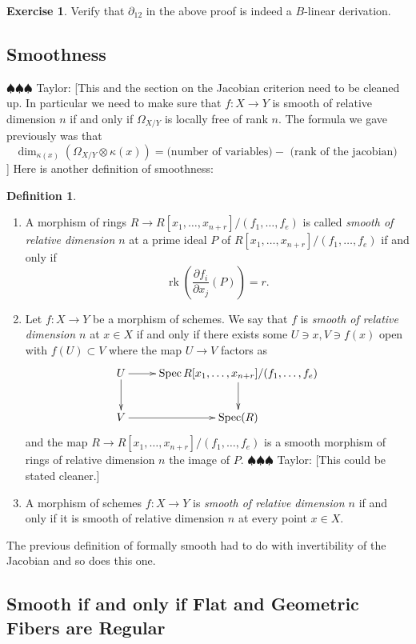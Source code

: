 \documentclass[12pt]{article}
\numberwithin{equation}{section}
\theoremstyle{definition}
\newtheorem{definition}[theorem]{Definition}
\newtheorem{exercise}[theorem]{Exercise}
\theoremstyle{remark}
\newcommand{\Spec}{\operatorname{Spec}}
\newcommand{\rk}{\operatorname{rk}}
\newcommand{\taylor}[1]{{\color{blue} \sf $\spadesuit\spadesuit\spadesuit$ Taylor: [#1]}}
\begin{document}
\begin{exercise}
	Verify that $\partial_{12}$ in the above proof is indeed a $B$-linear derivation.
\end{exercise}

\subsection{Smoothness}
\taylor{This and the section on the Jacobian criterion need to be cleaned up. 
In particular we need to make sure that $f:X \to Y$ is smooth of relative dimension $n$ if and only if $\Omega_{X/Y}$ is locally free of rank $n$. 
The formula we gave previously was that 
 $$ \dim_{\kappa(x)}(\Omega_{X/Y}\otimes \kappa(x)) = \mbox{(number of variables)} - \mbox{ (rank of the jacobian) } $$
}
Here is another definition of smoothness:
\begin{definition}
	\begin{enumerate}
		\item A morphism of rings $R \to R[x_1,\ldots,x_{n+r}]/(f_1,\ldots,f_e)$ is called \emph{smooth of relative dimension $n$} at a prime ideal $P$ of $R[x_1,\ldots,x_{n+r}]/(f_1,\ldots,f_e)$ if and only if 
		$$\rk( \dfrac{\partial f_i}{\partial x_j}(P) ) = r. $$
		\item Let $f:X\to Y$ be a morphism of schemes. 
		We say that $f$ is \emph{smooth of relative dimension $n$} at $x\in X$ if and only if there exists some $U \owns x, V\owns f(x)$ open with $f(U)\subset V$ where the map $U\to V$ factors as 
		$$
		\xymatrix{
			U \ar[r] \ar[d] & \Spec R[x_1,\ldots, x_{n+r}]/(f_1,\ldots,f_e) \ar[d] \\
			V \ar[r] & \Spec(R) 
		}
		$$
		and the map $R \to R[x_1,\ldots,x_{n+r}]/(f_1,\ldots,f_e)$ is a smooth morphism of rings of relative dimension $n$ the image of $P$. \taylor{This could be stated cleaner.}
		\item A morphism of schemes $f:X\to Y$ is \emph{smooth of relative dimension $n$} if and only if it is smooth of relative dimension $n$ at every point $x\in X$.
	\end{enumerate}
\end{definition}
The previous definition of formally smooth had to do with invertibility of the Jacobian and so does this one. 

\subsection{Smooth if and only if Flat and Geometric Fibers are Regular}
\end{document}
